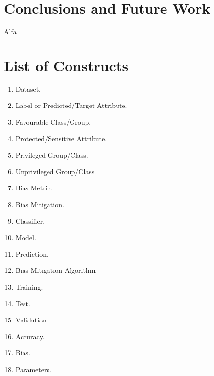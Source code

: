 \documentclass[final,5p,times,twocolumn]{elsarticle}
\begin{document}

\section{Conclusions and Future Work}
\label{sec:conclusions_and_future_work}

Alfa \cite{cormen2009introduction}

\appendix

\section{List of Constructs}
\label{sec:list_of_constructs}

\begin{enumerate}
	\item Dataset.
	\item Label or Predicted/Target Attribute.
	\item Favourable Class/Group.
	\item Protected/Sensitive Attribute.
	\item Privileged Group/Class.
	\item Unprivileged Group/Class.
	\item Bias Metric.
	\item Bias Mitigation.
	\item Classifier.
	\item Model.
	\item Prediction.
	\item Bias Mitigation Algorithm.
	\item Training.
	\item Test.
	\item Validation.
	\item Accuracy.
	\item Bias.
	\item Parameters.
\end{enumerate}


   
  


%
%
%
\end{document}
